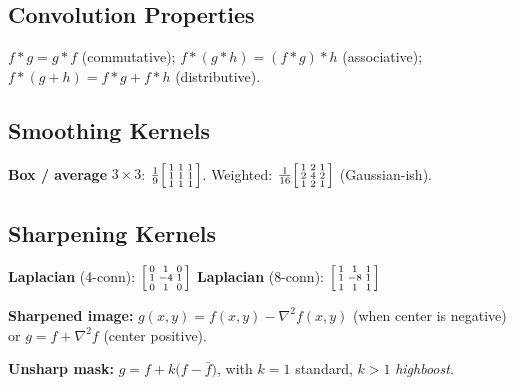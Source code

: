 \documentclass[10pt]{article}
\begin{document}
\subsection{Convolution Properties}
$f * g = g * f$ \quad (commutative); \quad
$f * (g * h) = (f*g)*h$ \quad (associative); \quad
$f*(g+h) = f*g + f*h$ \quad (distributive).

\subsection{Smoothing Kernels}
\begin{tcolorbox}[studybox]
\textbf{Box / average} $3\times 3$:
\(\frac{1}{9}\begin{bsmallmatrix}1&1&1\\1&1&1\\1&1&1\end{bsmallmatrix}\).
Weighted: \(\frac{1}{16}\begin{bsmallmatrix}1&2&1\\2&4&2\\1&2&1\end{bsmallmatrix}\) (Gaussian-ish).
\end{tcolorbox}

\subsection{Sharpening Kernels}
\begin{tcolorbox}[studybox]
\textbf{Laplacian} (4-conn):
\(\begin{bsmallmatrix}0&1&0\\1&-4&1\\0&1&0\end{bsmallmatrix}\)
\quad
\textbf{Laplacian} (8-conn):
\(\begin{bsmallmatrix}1&1&1\\1&-8&1\\1&1&1\end{bsmallmatrix}\)
\smallskip

\textbf{Sharpened image:}
\(g(x,y) = f(x,y) - \nabla^2 f(x,y)\) (when center is negative)
or \(g = f + \nabla^2 f\) (center positive).

\textbf{Unsharp mask:}
\(g = f + k\bigl(f - \bar{f}\bigr)\), with $k=1$ standard, $k>1$ \emph{highboost}.
\end{tcolorbox}
\end{document}
